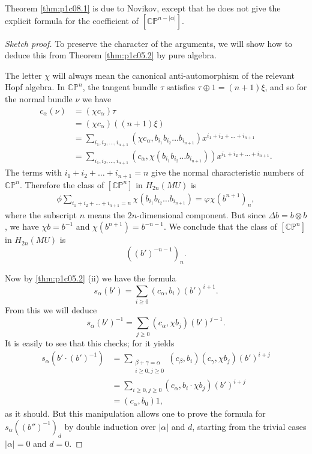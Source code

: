 \documentclass[../main]{subfiles}
\begin{document}
Theorem \ref{thm:p1c08.1} is due to Novikov, except that he does not give the explicit formula for the coefficient of $[\mathbb{CP}^{n-|\alpha|}]$.
\begin{proof}[Sketch proof]
To preserve the character of the arguments, we will show how to deduce this from Theorem \ref{thm:p1c05.2} by pure algebra.

The letter $\chi$ will always mean the canonical anti-automorphism of the relevant Hopf algebra. In $\mathbb{CP}^n$, the tangent bundle $\tau$ satisfies $\tau \oplus 1 = (n+1)\xi$, and so for the normal bundle $\nu$ we have
\begin{align*}
    c_\alpha (\nu) &= (\chi c_\alpha)\tau \\
    &= (\chi c_\alpha)((n+1)\xi) \\
    &= \sum_{i_1,i_2,\dots,i_{n+1}} (\chi c_\alpha , b_{i_1} b_{i_2} \dots b_{i_{n+1}})x^{i_1 + i_2 + \dots + i_{n+1}} \\
    &= \sum_{i_1,i_2,\dots,i_{n+1}} (c_\alpha , \chi(b_{i_1} b_{i_2} \dots b_{i_{n+1}}))x^{i_1 + i_2 + \dots + i_{n+1}}.
\end{align*}
The terms with $i_1 + i_2 + \dots + i_{n+1} = n$ give the normal characteristic numbers of $\mathbb{CP}^n$. Therefore the class of $[\mathbb{CP}^n]$ in $H_{2n}(MU)$ is 
\begin{align*}
    \phi \sum_{i_1 + i_2 + \dots + i_{n+1} = n}  \chi(b_{i_1} b_{i_2} \dots b_{i_{n+1}}) = \varphi \chi(b^{n+1})_n,
\end{align*}
where the subscript $n$ means the $2n$-dimensional component. But since $\Delta b = b \otimes b$, we have $\chi b = b^{-1}$ and $\chi(b^{n+1}) = b^{-n-1}$. We conclude that the class of $[\mathbb{CP}^n]$ in $H_{2n}(MU)$ is 
\[((b')^{-n-1})_n.\]

Now by \ref{thm:p1c05.2} (ii) we have the formula
\[s_\alpha(b') = \sum_{i \geq 0}(c_\alpha,b_i)(b')^{i+1}.\]
From this we will deduce
\begin{equation}
    \label{eqn:p1c08.2} s_\alpha (b')^{-1} = \sum_{j \geq 0} (c_\alpha, \chi b_j)(b')^{j-1}.
\end{equation}
It is easily to see that this checks; for it yields
\begin{align*}
    s_\alpha(b' \cdot (b')^{-1}) &= \sum_{\substack{\beta + \gamma = \alpha \\ i \geq 0, j \geq 0}} (c_\beta,b_i)(c_\gamma,\chi b_j)(b')^{i+j} \\
    &= \sum_{i \geq 0, j \geq 0} (c_\alpha, b_i \cdot \chi b_j)(b')^{i+j} \\
    &= (c_\alpha, b_0)1,
\end{align*}
as it should. But this manipulation allows one to prove the formula for $s_\alpha((b'')^{-1})_d$ by double induction over $|\alpha|$ and $d$, starting from the trivial cases $|\alpha| = 0$ and $d = 0$.


\end{proof}
\end{document}
